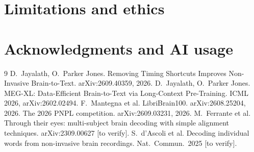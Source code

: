 \documentclass[11pt]{article}
\begin{document}
\section{Limitations and ethics}

\section*{Acknowledgments and AI usage}

\begin{thebibliography}{9}
 D.~Jayalath, O.~Parker Jones. Removing Timing Shortcuts Improves Non-Invasive Brain-to-Text. arXiv:2609.40359, 2026.
 D.~Jayalath, O.~Parker Jones. MEG-XL: Data-Efficient Brain-to-Text via Long-Context Pre-Training. ICML 2026, arXiv:2602.02494.
 F.~Mantegna et al. LibriBrain100. arXiv:2608.25204, 2026.
 The 2026 PNPL competition. arXiv:2609.03231, 2026.
 M.~Ferrante et al. Through their eyes: multi-subject brain decoding with simple alignment techniques. arXiv:2309.00627 [to verify].
 S.~d'Ascoli et al. Decoding individual words from non-invasive brain recordings. Nat.\ Commun.\ 2025 [to verify].
\end{thebibliography}
\end{document}
